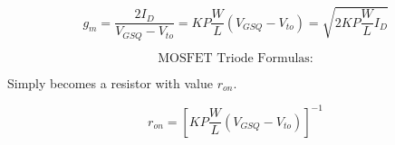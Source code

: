 \documentclass[12pt]{article}
\begin{document}
  $$g_m=\frac{2I_D}{V_{GSQ}-V_{to}}=KP\frac{W}{L}(V_{GSQ}-V_{to})=\sqrt{2KP\frac{W}{L}I_D}$$

  \begin{multicols}{2}

  \begin{center}
    $$\boxed{\text{MOSFET Triode Formulas:}}$$
  \end{center}

    Simply becomes a resistor with value $r_{on}$.

    $$r_{on}=\left[KP\frac{W}{L}(V_{GSQ}-V_{to})\right]^{-1}$$

  \end{multicols}
\end{document}
